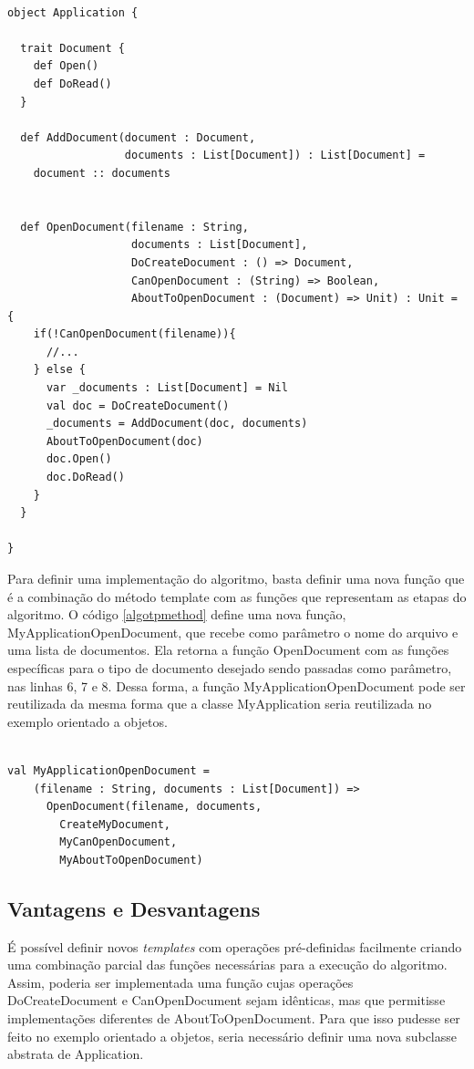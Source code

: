 \begin{lstlisting}[caption={Template Method Funcional},label=fptpmethod]
    
object Application {

  trait Document {
    def Open()
    def DoRead()
  }

  def AddDocument(document : Document,
                  documents : List[Document]) : List[Document] =
    document :: documents


  def OpenDocument(filename : String,
                   documents : List[Document],
                   DoCreateDocument : () => Document,
                   CanOpenDocument : (String) => Boolean,
                   AboutToOpenDocument : (Document) => Unit) : Unit = {
    if(!CanOpenDocument(filename)){
      //...
    } else {
      var _documents : List[Document] = Nil
      val doc = DoCreateDocument()
      _documents = AddDocument(doc, documents)
      AboutToOpenDocument(doc)
      doc.Open()
      doc.DoRead()
    }
  }

}

\end{lstlisting}

Para definir uma implementação do algoritmo, basta 
definir uma nova função que é a combinação do método 
template com as funções que representam as etapas do 
algoritmo. O código \ref{algotpmethod} define uma 
nova função, MyApplicationOpenDocument, que recebe 
como parâmetro o nome do arquivo e uma lista de 
documentos. Ela retorna a função OpenDocument com as 
funções específicas para o tipo de documento 
desejado sendo passadas como parâmetro, nas linhas 
6, 7 e 8. Dessa forma, a função MyApplicationOpenDocument 
pode ser reutilizada da mesma forma que a classe 
MyApplication seria reutilizada no exemplo orientado 
a objetos.

\begin{lstlisting}[caption={Definição do algoritmo},label=algotpmethod]
    
val MyApplicationOpenDocument = 
    (filename : String, documents : List[Document]) => 
      OpenDocument(filename, documents,
        CreateMyDocument,
        MyCanOpenDocument,
        MyAboutToOpenDocument)

\end{lstlisting}

\subsection*{Vantagens e Desvantagens}

É possível definir novos \textit{templates} com operações 
pré-definidas facilmente criando uma combinação parcial 
das funções necessárias para a execução do algoritmo. 
Assim, poderia ser implementada uma função cujas 
operações DoCreateDocument e CanOpenDocument sejam idênticas, 
mas que permitisse implementações diferentes de 
AboutToOpenDocument. Para que isso pudesse ser feito 
no exemplo orientado a objetos, seria necessário 
definir uma nova subclasse abstrata de Application.

